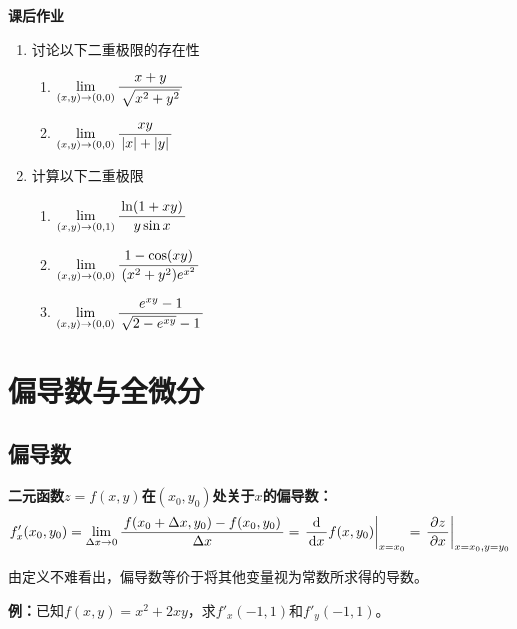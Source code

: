 \begin{ext}
	{\bf 课后作业}
	\begin{enumerate}
	  \item 讨论以下二重极限的存在性
	  \begin{enumerate}[(1)]
	    \item $\lim\limits_{(x,y)\to(0,0)}\displaystyle\frac{\,{x+y}\,}{\,{\sqrt{x^2+y^2}}\,}$
	    \item $\lim\limits_{(x,y)\to(0,0)}\displaystyle\frac{\,{xy}\,}{\,{|x|+|y|}\,}$
	  \end{enumerate}
	  \item 计算以下二重极限
	  \begin{enumerate}[(1)]
	    \item $\lim\limits_{(x,y)\to(0,1)}\displaystyle\frac{\,{\ln(1+xy)}\,}{\,{y\sin x}\,}$
	    \item $\lim\limits_{(x,y)\to(0,0)}\displaystyle\frac{\,{1-\cos(xy)}\,}{\,{(x^2+y^2)e^{x^2}}\,}$
	    \item $\lim\limits_{(x,y)\to(0,0)}\displaystyle\frac{\,{e^{xy}-1}\,}{\,{\sqrt{2-e^{xy}}-1}\,}$
	  \end{enumerate}
	\end{enumerate}
\end{ext}

\section{偏导数与全微分}

\subsection{偏导数}

\begin{thx}
{\bf 二元函数$z=f(x,y)$在$(x_0,y_0)$处关于$x$的偏导数：}
$$
	f'_x(x_0,y_0)
	 =  \lim\limits_{\Delta x\to 0}\displaystyle\frac{\,{f(x_0+\Delta x,y_0)-f(x_0,y_0)}\,}{\,{\Delta x}\,} 
	=\left.\displaystyle\frac{\,{\mathrm{d}}\,}{\,{\mathrm{d} x}\,}f(x,y_0)\right|_{x=x_0} 
	 =  {\left.\displaystyle\frac{\,{\partial z}\,}{\,{\partial x}\,}\right|_{x=x_0,y=y_0}}
$$
\end{thx}
由定义不难看出，偏导数等价于将其他变量视为常数所求得的导数。

{\bf 例：}已知$f(x,y)=x^2+2xy$，求$f'_x(-1,1)$和$f'_y(-1,1)$。

